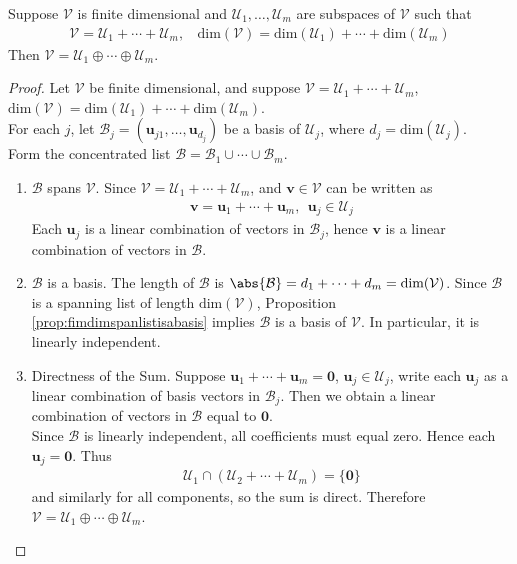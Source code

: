 \begin{proposition} Suppose $\mathcal{V}$ is finite dimensional and $\mathcal{U}_1, \ldots, \mathcal{U}_m$ are subspaces of $\mathcal{V}$ such that
\begin{align}
\mathcal{V} = \mathcal{U}_1 + \cdots + \mathcal{U}_m, \ \ \ \ \text{dim}(\mathcal{V}) = \text{dim}(\mathcal{U}_1) + \cdots + \text{dim}(\mathcal{U}_m) \nonumber
\end{align}
Then $\mathcal{V} = \mathcal{U}_1 \oplus \cdots \oplus \mathcal{U}_m$.
\begin{proof} Let $\mathcal{V}$ be finite dimensional, and suppose $\mathcal{V} = \mathcal{U}_1 + \cdots + \mathcal{U}_m$, $\text{dim}(\mathcal{V}) = \text{dim}(\mathcal{U}_1) + \cdots + \text{dim}(\mathcal{U}_m)$.\\
For each $j$, let $\mathcal{B}_j = (\mathbf{u}_{j1}, \ldots, \mathbf{u}_{d_j})$ be a basis of $\mathcal{U}_j$, where $d_j = \text{dim}(\mathcal{U}_j)$.\\
Form the concentrated list $\mathcal{B} = \mathcal{B}_1 \cup \cdots \cup \mathcal{B}_m$.
\begin{enumerate}[label=\roman*.]
\setlength{\itemsep}{0pt}
\item $\mathcal{B}$ spans $\mathcal{V}$. Since $\mathcal{V} = \mathcal{U}_1 + \cdots + \mathcal{U}_m$, and $\mathbf{v} \in \mathcal{V}$ can be written as
\begin{align}
\mathbf{v} = \mathbf{u}_1 + \cdots + \mathbf{u}_m, \ \ \mathbf{u}_j \in \mathcal{U}_j \nonumber
\end{align}
Each $\mathbf{u}_j$ is a linear combination of vectors in $\mathcal{B}_j$, hence $\mathbf{v}$ is a linear combination of vectors in $\mathcal{B}$.
\item $\mathcal{B}$ is a basis. The length of $\mathcal{B}$ is $\abs{\mathcal{B}} = d_1 + \cdots + d_m = \text{dim}(\mathcal{V})$. Since $\mathcal{B}$ is a spanning list of length $\text{dim}(\mathcal{V})$, Proposition \ref{prop:fimdimspanlistisabasis} implies $\mathcal{B}$ is a basis of $\mathcal{V}$. In particular, it is linearly independent.
\item Directness of the Sum. Suppose $\mathbf{u}_1 + \cdots + \mathbf{u}_m = \mathbf{0}$, $\mathbf{u}_j \in \mathcal{U}_j$, write each $\mathbf{u}_j$ as a linear combination of basis vectors in $\mathcal{B}_j$. Then we obtain a linear combination of vectors in $\mathcal{B}$ equal to $\mathbf{0}$.\\
Since $\mathcal{B}$ is linearly independent, all coefficients must equal zero. Hence each $\mathbf{u}_j = \mathbf{0}$. Thus
\begin{align}
\mathcal{U}_1 \cap (\mathcal{U}_2 + \cdots + \mathcal{U}_m) = \{ \mathbf{0} \} \nonumber
\end{align}
and similarly for all components, so the sum is direct. Therefore $\mathcal{V} = \mathcal{U}_1 \oplus \cdots \oplus \mathcal{U}_m$.
\end{enumerate}
\end{proof}
\end{proposition}


